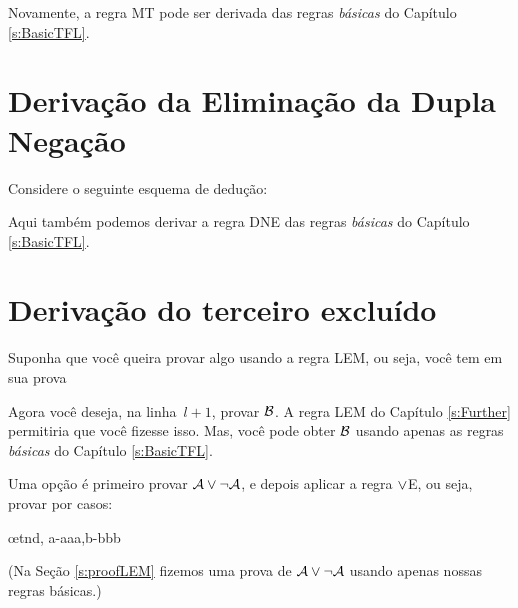 \begin{fitchproof}
		\open
		\close
\end{fitchproof}
Novamente, a regra  MT pode ser derivada das regras  \emph{b\'asicas} do Capítulo \ref{s:BasicTFL}.


\section{Deriva\c c\~ao da Elimina\c c\~ao da Dupla Nega\c c\~ao}
Considere o seguinte esquema de dedu\c c\~ao:
	\begin{fitchproof}
	\open
	\close
\end{fitchproof}
Aqui tamb\'em podemos derivar a regra DNE das regras \emph{b\'asicas} do Capítulo \ref{s:BasicTFL}.

\section{Deriva\c c\~ao do terceiro exclu\'ido}
Suponha que voc\^e queira provar algo usando a regra LEM, ou seja, voc\^e tem em sua prova
 
\begin{fitchproof}
  \open
  \close
  \open
  \close
\end{fitchproof}
Agora voc\^e deseja, na linha~$l+1$, provar $\mathcal{B}$. A regra LEM do Capítulo \ref{s:Further} permitiria que voc\^e fizesse isso. Mas, voc\^e pode obter $\mathcal{B}$ usando apenas as regras  \emph{b\'asicas} do Cap\'itulo \ref{s:BasicTFL}.

Uma op\c c\~ao \'e primeiro provar  $\mathcal{A} \vee \neg\mathcal{A}$, e depois aplicar a regra $\vee$E, ou seja, provar por casos:
\begin{fitchproof}
  \open
  \close
  \open
  \close
  \ellipsesline
  \oe{tnd, a-aaa,b-bbb}
\end{fitchproof}
(Na Seç\~ao \ref{s:proofLEM} fizemos uma prova de $\mathcal{A} \vee \neg\mathcal{A}$  usando apenas nossas regras b\'asicas.)

